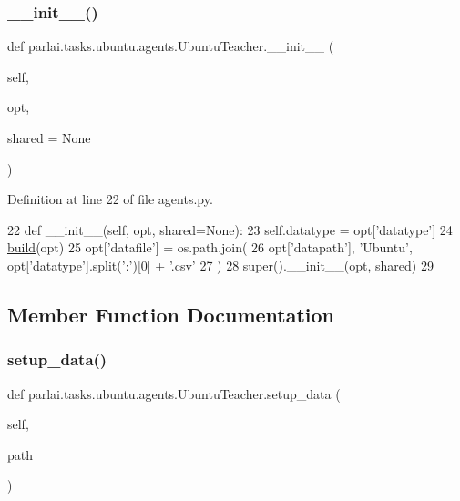 \subsubsection{\texorpdfstring{\+\_\+\+\_\+init\+\_\+\+\_\+()}{\_\_init\_\_()}}
{\footnotesize\ttfamily def parlai.\+tasks.\+ubuntu.\+agents.\+Ubuntu\+Teacher.\+\_\+\+\_\+init\+\_\+\+\_\+ (\begin{DoxyParamCaption}\item[{}]{self,  }\item[{}]{opt,  }\item[{}]{shared = {\ttfamily None} }\end{DoxyParamCaption})}



Definition at line 22 of file agents.\+py.


\begin{DoxyCode}
22     \textcolor{keyword}{def }\_\_init\_\_(self, opt, shared=None):
23         self.datatype = opt[\textcolor{stringliteral}{'datatype'}]
24         \hyperlink{namespaceparlai_1_1mturk_1_1tasks_1_1talkthewalk_1_1download_a8c0fbb9b6dfe127cb8c1bd6e7c4e33fd}{build}(opt)
25         opt[\textcolor{stringliteral}{'datafile'}] = os.path.join(
26             opt[\textcolor{stringliteral}{'datapath'}], \textcolor{stringliteral}{'Ubuntu'}, opt[\textcolor{stringliteral}{'datatype'}].split(\textcolor{stringliteral}{':'})[0] + \textcolor{stringliteral}{'.csv'}
27         )
28         super().\_\_init\_\_(opt, shared)
29 
\end{DoxyCode}


\subsection{Member Function Documentation}
\mbox{\label{classparlai_1_1tasks_1_1ubuntu_1_1agents_1_1UbuntuTeacher_ac8386ce4d46f4d3e8b296ac291ff4997}} 
\subsubsection{\texorpdfstring{setup\+\_\+data()}{setup\_data()}}
{\footnotesize\ttfamily def parlai.\+tasks.\+ubuntu.\+agents.\+Ubuntu\+Teacher.\+setup\+\_\+data (\begin{DoxyParamCaption}\item[{}]{self,  }\item[{}]{path }\end{DoxyParamCaption})}



